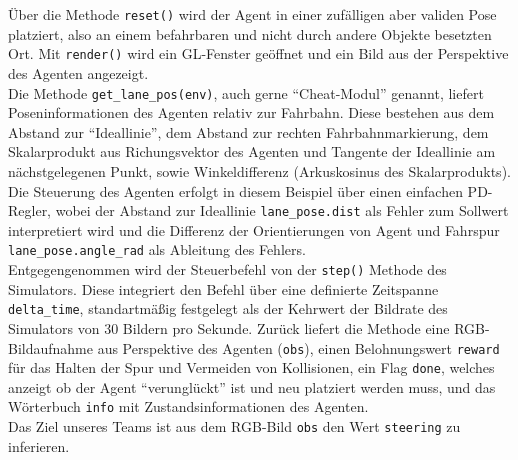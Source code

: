 Über die Methode \texttt{reset()} wird der Agent in einer zufälligen aber validen Pose platziert, also an einem befahrbaren und nicht durch andere Objekte besetzten Ort. Mit \texttt{render()} wird ein GL-Fenster geöffnet und ein Bild aus der Perspektive des Agenten angezeigt.\\

Die Methode \texttt{get\_lane\_pos(env)}, auch gerne ``Cheat-Modul'' genannt, liefert Poseninformationen des Agenten relativ zur Fahrbahn. Diese bestehen aus dem Abstand zur ``Ideallinie'', dem Abstand zur rechten Fahrbahnmarkierung, dem Skalarprodukt aus Richungsvektor des Agenten und Tangente der Ideallinie am nächstgelegenen Punkt, sowie Winkeldifferenz (Arkuskosinus des Skalarprodukts).\\

Die Steuerung des Agenten erfolgt in diesem Beispiel über einen einfachen PD-Regler, wobei der Abstand zur Ideallinie \texttt{lane\_pose.dist} als Fehler zum Sollwert interpretiert wird und die Differenz der Orientierungen von Agent und Fahrspur \texttt{lane\_pose.angle\_rad} als Ableitung des Fehlers.\\

Entgegengenommen wird der Steuerbefehl von der \texttt{step()} Methode des Simulators. Diese integriert den Befehl über eine definierte Zeitspanne \texttt{delta\_time}, standartmäßig festgelegt als der Kehrwert der Bildrate des Simulators von 30 Bildern pro Sekunde. Zurück liefert die Methode eine RGB-Bildaufnahme aus Perspektive des Agenten (\texttt{obs}), einen Belohnungswert \texttt{reward} für das Halten der Spur und Vermeiden von Kollisionen, ein Flag \texttt{done}, welches anzeigt ob der Agent ``verunglückt'' ist und neu platziert werden muss, und das Wörterbuch \texttt{info} mit Zustandsinformationen des Agenten.\\

Das Ziel unseres Teams ist aus dem RGB-Bild \texttt{obs} den Wert \texttt{steering} zu inferieren.